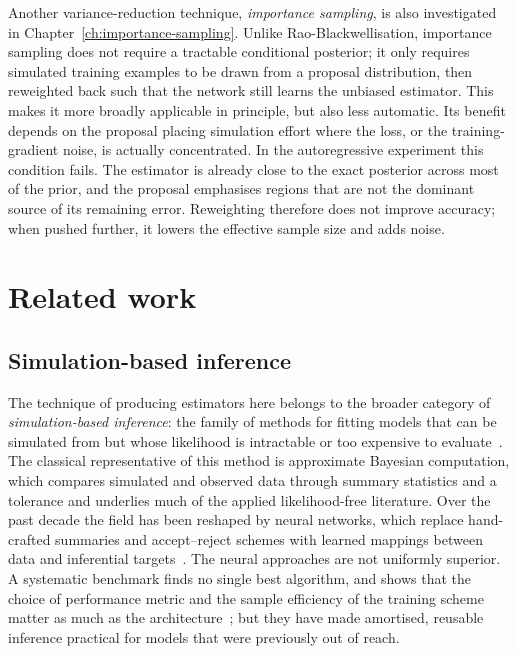 Another variance-reduction technique, \emph{importance sampling}, is also investigated in Chapter~\ref{ch:importance-sampling}. Unlike Rao-Blackwellisation, importance sampling does not require a tractable conditional posterior; it only requires simulated training examples to be drawn from a proposal distribution, then reweighted back such that the network still learns the unbiased estimator. This makes it more broadly applicable in principle, but also less automatic. Its benefit depends on the proposal placing simulation effort where the loss, or the training-gradient noise, is actually concentrated. In the autoregressive experiment this condition fails. The estimator is already close to the exact posterior across most of the prior, and the proposal emphasises regions that are not the dominant source of its remaining error. Reweighting therefore does not improve accuracy; when pushed further, it lowers the effective sample size and adds noise.



\section{Related work}
\label{sec:related-work}

\subsection{Simulation-based inference}
\label{sec:rw-sbi}

The technique of producing estimators here belongs to the broader category of \emph{simulation-based
inference}: the family of methods for fitting models that can be
simulated from but whose likelihood is intractable or too expensive to
evaluate~\citep{cranmer2020frontier}. The classical representative of this method is
approximate Bayesian computation, which compares simulated and
observed data through summary statistics and a tolerance and underlies
much of the applied likelihood-free literature. Over the past decade
the field has been reshaped by neural networks, which replace
hand-crafted summaries and accept--reject schemes with learned
mappings between data and inferential targets~\citep{zammitmangion2025neural}.
The neural approaches are not uniformly superior. A systematic
benchmark finds no single best algorithm, and shows that the choice of
performance metric and the sample efficiency of the training scheme
matter as much as the architecture~\citep{lueckmann2021benchmarking};
but they have made amortised, reusable inference practical for models
that were previously out of reach.

